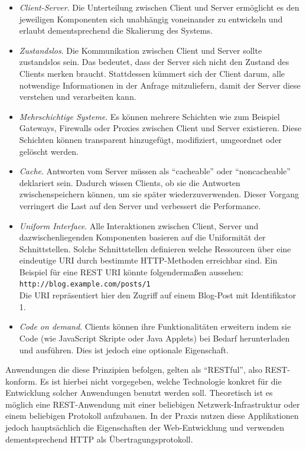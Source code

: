 \begin{itemize}
	\item \textit{Client-Server}. Die Unterteilung zwischen Client und Server ermöglicht es den jeweiligen Komponenten sich unabhängig voneinander zu entwickeln und erlaubt dementsprechend die Skalierung des Systems.
	\item \textit{Zustandslos}. Die Kommunikation zwischen Client und Server sollte zustandslos sein. Das bedeutet, dass der Server sich nicht den Zustand des Clients merken braucht. Stattdessen kümmert sich der Client darum, alle notwendige Informationen in der Anfrage mitzuliefern, damit der Server diese verstehen und verarbeiten kann.
	\item \textit{Mehrschichtige Systeme}. Es können mehrere Schichten wie zum Beispiel Gateways, Firewalls oder Proxies zwischen Client und Server existieren. Diese Schichten können transparent hinzugefügt, modifiziert, umgeordnet oder gelöscht werden.
	\item \textit{Cache}. Antworten vom Server müssen als \enquote{cacheable} oder \enquote{noncacheable} deklariert sein. Dadurch wissen Clients, ob sie die Antworten zwischenspeichern können, um sie später wiederzuverwenden. Dieser Vorgang verringert die Last auf den Server und verbessert die Performance.
	\item \textit{Uniform Interface}. Alle Interaktionen zwischen Client, Server und dazwischenliegenden Komponenten basieren auf die Uniformität der Schnittstellen. Solche Schnittstellen definieren welche Ressourcen über eine eindeutige \acs{URI} durch bestimmte \acs{HTTP}-Methoden erreichbar sind. Ein Beispiel für eine REST URI könnte folgendermaßen aussehen: \\
	\texttt{http://blog.example.com/posts/1}\\
	Die URI repräsentiert hier den Zugriff auf einem Blog-Post mit Identifikator 1.
	\item \textit{Code on demand}. Clients können ihre Funktionalitäten erweitern indem sie Code (wie JavaScript Skripte oder Java Applets) bei Bedarf herunterladen und ausführen. Dies ist jedoch eine optionale Eigenschaft.
\end{itemize}

Anwendungen die diese Prinzipien befolgen, gelten als \enquote{RESTful}, also REST-konform. Es ist hierbei nicht vorgegeben, welche Technologie konkret für die Entwicklung solcher Anwendungen benutzt werden soll. Theoretisch ist es möglich eine REST-Anwendung mit einer beliebigen Netzwerk-Infrastruktur oder einem beliebigen Protokoll aufzubauen. In der Praxis nutzen diese Applikationen jedoch hauptsächlich die Eigenschaften der Web-Entwicklung und verwenden dementsprechend \acs{HTTP} als Übertragungsprotokoll.

